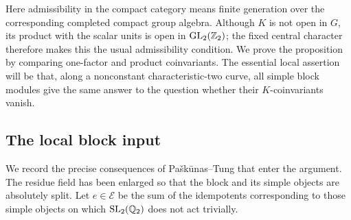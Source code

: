 Here admissibility in the compact category means finite generation over
the corresponding completed compact group algebra. Although \(K\) is
not open in \(G\), its product with the scalar units is open in
\(\operatorname{GL}_2(\mathbb Z_2)\); the fixed central character therefore makes this the
usual admissibility condition. We prove the proposition by comparing
one-factor and product coinvariants. The essential local assertion will
be that, along a nonconstant characteristic-two curve, all simple block
modules give the same answer to the question whether their
\(K\)-coinvariants vanish.

\subsection{The local block input}

We record the precise consequences of Pa\v{s}k\=unas--Tung that enter the
argument. The residue field has been enlarged so that the block and its
simple objects are absolutely split. Let \(e\in\mathcal E\) be the sum
of the idempotents corresponding to those simple objects on which
\(\operatorname{SL}_2(\mathbb Q_2)\) does not act trivially.

